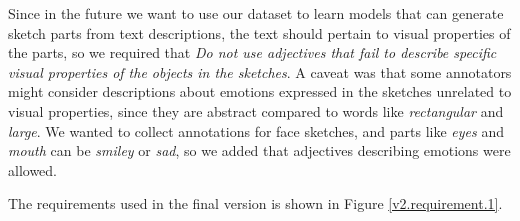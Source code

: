 Since in the future we want to use our dataset to learn models that can generate sketch parts from text descriptions, the text should pertain to visual properties of the parts, so we required that \textit{Do not use adjectives that fail to describe specific visual properties of the objects in the sketches}. 
A caveat was that some annotators might consider descriptions about emotions expressed in the sketches unrelated to visual properties, since they are abstract compared to words like \textit{rectangular} and \textit{large}. 
We wanted to collect annotations for face sketches, and parts like \textit{eyes} and \textit{mouth} can be \textit{smiley} or \textit{sad}, so we added that adjectives describing emotions were allowed. 

The requirements used in the final version is shown in Figure \ref{v2.requirement.1}.








